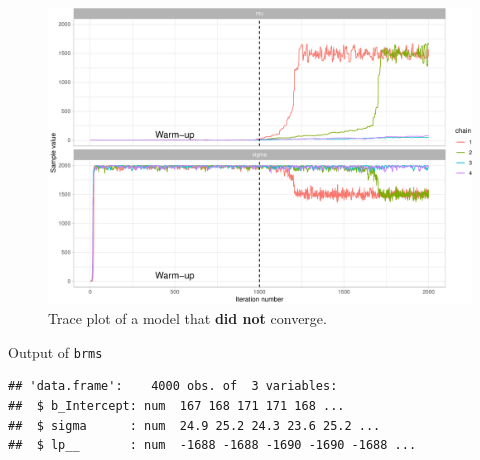 \documentclass[12pt,ignorenonframetext,aspectratio=169]{beamer}
\newenvironment{Shaded}{\begin{snugshade}}{\end{snugshade}}
\newcommand{\KeywordTok}[1]{\textcolor[rgb]{0.13,0.29,0.53}{\textbf{#1}}}
\newcommand{\NormalTok}[1]{#1}
\newcommand{\OperatorTok}[1]{\textcolor[rgb]{0.81,0.36,0.00}{\textbf{#1}}}
\newcommand{\StringTok}[1]{\textcolor[rgb]{0.31,0.60,0.02}{#1}}
\begin{document}
\begin{frame}



\small

\begin{figure}
\centering
\includegraphics{03-compbayes-slides_files/figure-beamer/warmup2-1.pdf}
\caption{\label{fig:warmup2}Trace plot of a model that \textbf{did not} converge.}
\end{figure}

\normalsize

\end{frame}

\begin{frame}[fragile]{Output of \texttt{brms}}
\protect\hypertarget{output-of-brms}{}

\small

\begin{Shaded}
\end{Shaded}

\begin{verbatim}
## 'data.frame':    4000 obs. of  3 variables:
##  $ b_Intercept: num  167 168 171 171 168 ...
##  $ sigma      : num  24.9 25.2 24.3 23.6 25.2 ...
##  $ lp__       : num  -1688 -1688 -1690 -1690 -1688 ...
\end{verbatim}

\normalsize

\end{frame}
\end{document}
